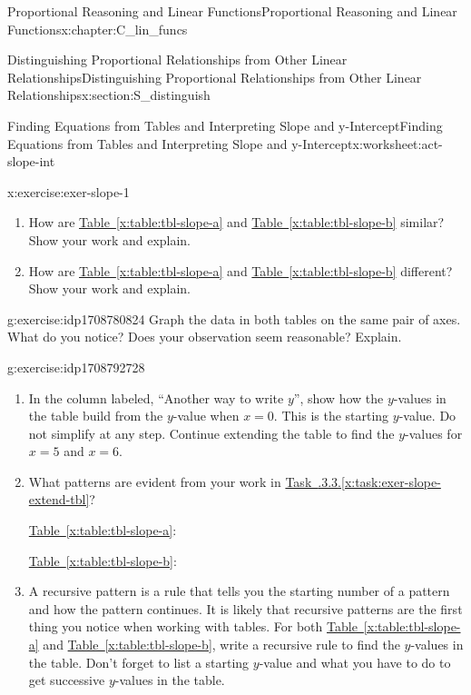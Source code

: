 \documentclass[oneside,10pt,]{book}
\newcommand{\xreffont}{\relax}
\numberwithin{equation}{chapter}
\begin{document}
\begin{chapterptx}{Proportional Reasoning and Linear Functions}{}{Proportional Reasoning and Linear Functions}{}{}{x:chapter:C_lin_funcs}
\begin{sectionptx}{Distinguishing Proportional Relationships from Other Linear Relationships}{}{Distinguishing Proportional Relationships from Other Linear Relationships}{}{}{x:section:S_distinguish}
\begin{worksheet-subsection}{Finding Equations from Tables and Interpreting Slope and y-Intercept}{}{Finding Equations from Tables and Interpreting Slope and y-Intercept}{}{}{x:worksheet:act-slope-int}
\begin{divisionexercise}{1}{}{}{x:exercise:exer-slope-1}
\begin{enumerate}[font=\bfseries,label=(\alph*),ref=\alph*]
\begin{sidebyside}{2}{0}{0}{0}
\end{sidebyside}%
\item{}How are \hyperref[x:table:tbl-slope-a]{Table~{\xreffont\ref{x:table:tbl-slope-a}}} and \hyperref[x:table:tbl-slope-b]{Table~{\xreffont\ref{x:table:tbl-slope-b}}} similar? Show your work and explain.%
\item{}How are \hyperref[x:table:tbl-slope-a]{Table~{\xreffont\ref{x:table:tbl-slope-a}}} and \hyperref[x:table:tbl-slope-b]{Table~{\xreffont\ref{x:table:tbl-slope-b}}} different? Show your work and explain.%
\end{enumerate}
\end{divisionexercise}%
\begin{divisionexercise}{2}{}{}{g:exercise:idp1708780824}%
Graph the data in both tables on the same pair of axes. What do you notice? Does your observation seem reasonable? Explain.%
\end{divisionexercise}%
\begin{divisionexercise}{3}{}{}{g:exercise:idp1708792728}%
\begin{enumerate}[font=\bfseries,label=(\alph*),ref=\alph*]
\item\label{x:task:exer-slope-extend-tbl}In the column labeled, ``Another way to write \(y\)'', show how the \(y\)-values in the table build from the \(y\)-value when \(x = 0\). This is the starting \(y\)-value. Do not simplify at any step. Continue extending the table to find the \(y\)-values for \(x = 5\) and \(x = 6\).%
\item{}What patterns are evident from your work in \hyperref[x:task:exer-slope-extend-tbl]{Task~{\xreffont 2.6.3.3}.{\xreffont\ref{x:task:exer-slope-extend-tbl}}}?%
\par
\hyperref[x:table:tbl-slope-a]{Table~{\xreffont\ref{x:table:tbl-slope-a}}}:%
\par
\hyperref[x:table:tbl-slope-b]{Table~{\xreffont\ref{x:table:tbl-slope-b}}}:%
\item{}A recursive pattern is a rule that tells you the starting number of a pattern and how the pattern continues. It is likely that recursive patterns are the first thing you notice when working with tables. For both \hyperref[x:table:tbl-slope-a]{Table~{\xreffont\ref{x:table:tbl-slope-a}}} and \hyperref[x:table:tbl-slope-b]{Table~{\xreffont\ref{x:table:tbl-slope-b}}}, write a recursive rule to find the \(y\)-values in the table. Don't forget to list a starting \(y\)-value and what you have to do to get successive \(y\)-values in the table.%
\par

\end{enumerate}
\end{divisionexercise}
\end{worksheet-subsection}
\end{sectionptx}
\end{chapterptx}
\end{document}
